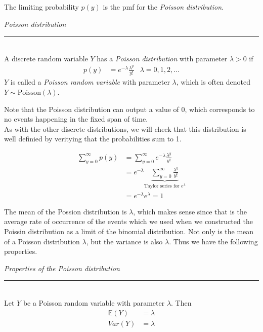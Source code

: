 \documentclass[12pt]{article}
\theoremstyle{definition}
\theoremstyle{remark}
\def\E{{\mathbb E}}
\begin{document}
The limiting probability $p(y)$ is the pmf for the \emph{Poisson distribution}.

\begin{framed}
\emph{Poisson distribution}\\
  \rule{\dimexpr{}\fboxrule}{.1pt} \\
A discrete random variable $Y$ has a \emph{Poisson distribution} with parameter $\lambda > 0$ if 
\begin{align*}
p(y) &= e^{-\lambda}\frac{\lambda^y}{y!} &\lambda = 0, 1, 2, \dots
\end{align*}
$Y$ is called a \emph{Poisson random variable} with parameter $\lambda$, which is often denoted $Y\sim\text{Poisson}(\lambda)$.
\end{framed}
Note that the Poisson distribution can output a value of 0, which corresponds to no events happening in the fixed span of time.\\

As with the other discrete distributions, we will check that this distribution is well definied by veritying that the probabilities sum to 1.

\begin{align*}
\sum_{y=0}^\infty p(y) &= \sum_{y=0}^\infty e^{-\lambda}\frac{\lambda^y}{y!} \\
&= e^{-\lambda} \underbrace{\sum_{y=0}^\infty \frac{\lambda^y}{y!}}_{\text{Taylor series for }e^{\lambda}}\\
&= e^{-\lambda}e^{\lambda} = 1
\end{align*}

The mean of the Possion distribution is $\lambda$, which makes sense since that is the average rate of occurrence of the events which we used when we constructed the Poissin distribution as a limit of the binomial distribution. Not only is the mean of a Poisson distribution $\lambda$, but the variance is also $\lambda$. Thus we have the following properties.

\begin{framed}
\emph{Properties of the Poisson distribution}\\
  \rule{\dimexpr{}\fboxrule}{.1pt} \\
Let $Y$ be a Poisson random variable with parameter $\lambda$. Then
\begin{align*}
\E(Y) &= \lambda \\
Var(Y) &= \lambda
\end{align*}
\end{framed}
\end{document}
